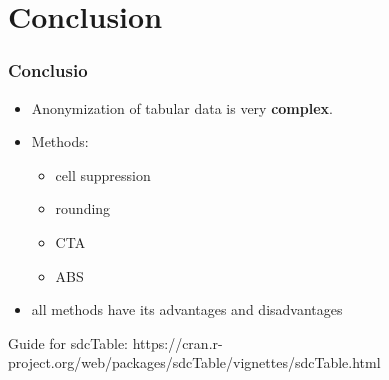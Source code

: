 \documentclass[pdfpagelabels=false, usepdftitle=false]{beamer}
\begin{document}
\section{Conclusion}
\begin{frame}\frametitle{Conclusio}
	\begin{itemize}
		\item Anonymization of tabular data is very {\bf complex}. \pause
		\item Methods: \pause
		\begin{itemize} 
			\item cell suppression
			\item rounding
			\item CTA 
			\item ABS 
			\pause
		\end{itemize}
		\item all methods have its advantages and disadvantages
	\end{itemize}
	
	Guide for sdcTable:
	https://cran.r-project.org/web/packages/sdcTable/vignettes/sdcTable.html
\end{frame}
\end{document}
